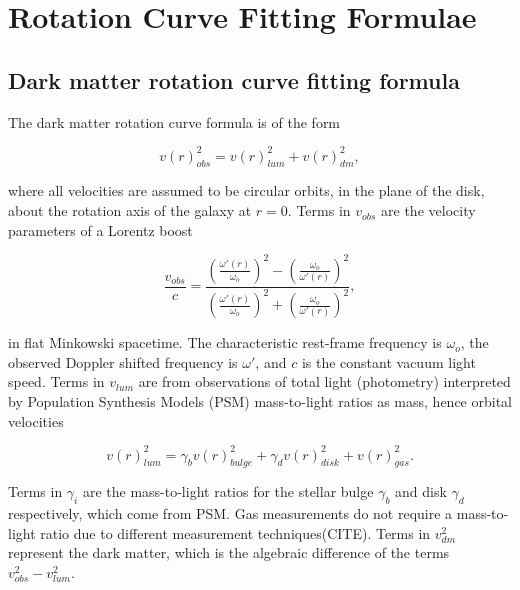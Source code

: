 \documentclass[reprint,%
 amsmath,amssymb,
 aps,
]{revtex4-1}
\begin{document}
\section{Rotation Curve Fitting Formulae  \label{sec:dos}}
 
 
 \subsection{Dark matter rotation curve fitting formula}
 
  

 The   dark matter rotation curve formula   is of the form

 \begin{equation}
v(r)^2_{obs}  =  v(r)^2_{lum}  +  v(r)^2_{dm},   
\label{eq:zonte1}
\end{equation} 

  where all velocities are assumed to be circular orbits, in the plane of the disk,  about the rotation axis of the galaxy at  $r=0$. 
Terms in  $v_{obs}$ are the velocity parameters   of a  Lorentz boost
   

 \begin{equation}
 \frac{v_{obs} }{c}=
\frac{  \left( \frac{\omega'(r)}{\omega_o}\right)^2 -  \left( \frac{\omega_o}{\omega'(r)} \right)^2 }{  \left( \frac{\omega'(r)}{\omega_o}\right)^2  +  \left( \frac{\omega_o}{\omega'(r)}\right)^2 },
\label{eq:modelLumA}
\end{equation} 

 in flat Minkowski spacetime. The    
  characteristic rest-frame frequency is $\omega_o$, the  observed  Doppler shifted frequency is $\omega'$, and $c$ is the constant vacuum light speed.  
 Terms in  $v_{lum}$ are from observations of total light  (photometry) interpreted by Population Synthesis Models (PSM) mass-to-light ratios as mass,   hence orbital velocities  
  
   \begin{equation}
v(r)_{lum}^2 = \gamma_b v(r)_{bulge}^2 +  \gamma_d v(r)_{disk}^2 + v(r)_{gas}^2.    
\label{eq:zonte3}
\end{equation} 
  
 Terms in    $\gamma_i$  are the mass-to-light ratios for the stellar bulge $\gamma_b$ and disk $\gamma_d$ respectively, which come from PSM. Gas measurements do not require  a mass-to-light ratio due to different measurement techniques(CITE).  
 Terms in $v^2_{dm}$ represent
the dark matter, which is  the algebraic difference of the   terms  $v^2_{obs}-v^2_{lum}$. 
\end{document}
